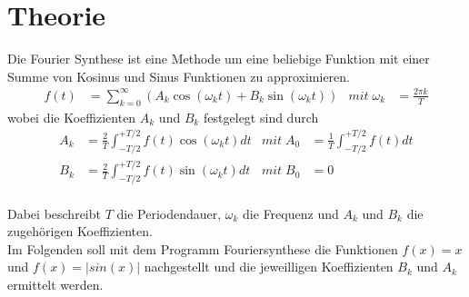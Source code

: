 \section{Theorie}
\label{sec:Theorie}
Die Fourier Synthese ist eine Methode um eine beliebige Funktion mit einer Summe von Kosinus und Sinus Funktionen zu approximieren.
\begin{align}
    f(t) &= \sum_{k=0}^{\infty} (A_k\cos(\omega_k t)+B_k\sin(\omega_k t)) &   mit \; \omega_k &= \frac{2\pi k}{T}
\end{align}
wobei die Koeffizienten $A_k$ und $B_k$ festgelegt sind durch
\begin{align}
    A_k &= \frac{2}{T} \int_{-T/2}^{+T/2} f(t)\cos(\omega_k t) dt    &  mit \; A_0 &= \frac{1}{T} \int_{-T/2}^{+T/2} f(t) dt \\
    B_k &= \frac{2}{T} \int_{-T/2}^{+T/2} f(t)\sin(\omega_k t) dt    &  mit \; B_0 &= 0
\end{align}
\\
Dabei beschreibt $T$ die Periodendauer, $\omega_k$ die Frequenz und $A_k$ und $B_k$ die zugehörigen Koeffizienten. \\
Im Folgenden soll mit dem Programm Fouriersynthese %
die Funktionen $f(x)=x$ und $f(x)=|sin(x)|$ nachgestellt und die jeweilligen Koeffizienten $B_k$ und $A_k$ ermittelt werden.

